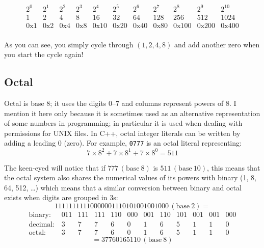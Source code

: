 \documentclass[a4paper]{scrartcl}
\newcommand{\decimal}{\ensuremath{\,(\mathrm{base}~10)}}
\newcommand{\binary}{\ensuremath{\,(\mathrm{base}~2)}}
\newcommand{\octal}{\ensuremath{\,(\mathrm{base}~8)}}
\begin{document}
\[\begin{array}{ccccccccccc}
2^0 & 2^1 & 2^2 & 2^3 & 2^4 & 2^5 & 2^6 & 2^7 & 2^8 & 2^9 & 2^{10} \\
1 & 2 & 4 & 8 & 16 & 32 & 64 & 128 & 256 & 512 & 1024 \\
\mathrm{0x1} & \mathrm{0x2} & \mathrm{0x4} & \mathrm{0x8} & \mathrm{0x10} & \mathrm{0x20} & \mathrm{0x40} & \mathrm{0x80} & \mathrm{0x100} & \mathrm{0x200} & \mathrm{0x40}0\\
\end{array}\]

As you can see, you simply cycle through $(1, 2, 4, 8)$ and add another zero when you start the cycle again!

\subsection{Octal}
Octal is base $8$; it uses the digits 0--7 and columns represent powers of 8. I mention it here only because it is sometimes used as an alternative representation of some numbers in programming; in particular it is used when dealing with permissions for UNIX files. In C++, octal integer literals can be written by adding a leading 0 (zero). For example, \texttt{0777} is an octal literal representing:
\[ 7\times8^2 + 7\times8^1 + 7\times8^0 = 511 \]

The keen-eyed will notice that if $777\octal$ is $511\decimal$, this means that the octal system also shares the numerical values of its powers with binary (1, 8, 64, 512, \ldots) which means that a similar conversion between binary and octal exists when digits are grouped in 3s:
\[ 11111111110000001110101001001000\binary = \]
\[\begin{array}{lccccccccccc}
\mathrm{binary:}  & 011 & 111 & 111 & 110 & 000 & 001 & 110 & 101 & 001 & 001 & 000 \\
\mathrm{decimal:} & 3   & 7   & 7   & 6   & 0   & 1   & 6   & 5   & 1   & 1   & 0 \\
\mathrm{octal:}   & 3   & 7   & 7   & 6   & 0   & 1   & 6   & 5   & 1   & 1   & 0 
\end{array}\]
\[ = 37760165110\octal \]


\end{document}
